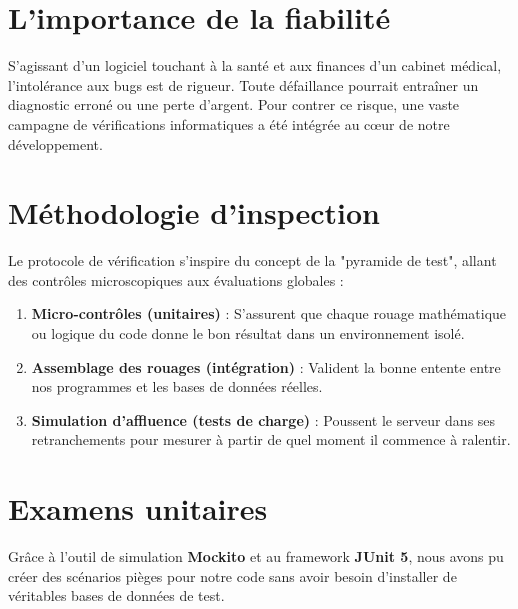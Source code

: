 \documentclass[final]{report}
\begin{document}
\section{L'importance de la fiabilité}
S'agissant d'un logiciel touchant à la santé et aux finances d'un cabinet médical, l'intolérance aux bugs est de rigueur. Toute défaillance pourrait entraîner un diagnostic erroné ou une perte d'argent. Pour contrer ce risque, une vaste campagne de vérifications informatiques a été intégrée au cœur de notre développement.
 
\section{Méthodologie d'inspection}
Le protocole de vérification s'inspire du concept de la "pyramide de test", allant des contrôles microscopiques aux évaluations globales :
\begin{enumerate}
  \item \textbf{Micro-contrôles (unitaires)} : S'assurent que chaque rouage mathématique ou logique du code donne le bon résultat dans un environnement isolé.
  \item \textbf{Assemblage des rouages (intégration)} : Valident la bonne entente entre nos programmes et les bases de données réelles.
  \item \textbf{Simulation d'affluence (tests de charge)} : Poussent le serveur dans ses retranchements pour mesurer à partir de quel moment il commence à ralentir.
\end{enumerate}
 
\section{Examens unitaires}
Grâce à l'outil de simulation \textbf{Mockito} et au framework \textbf{JUnit 5}, nous avons pu créer des scénarios pièges pour notre code sans avoir besoin d'installer de véritables bases de données de test.
 
\end{document}
